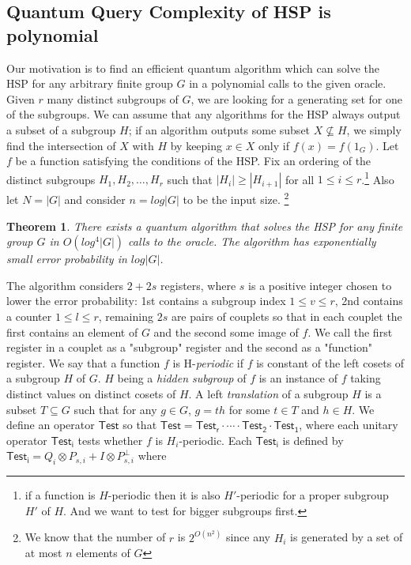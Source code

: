 \documentclass[12pt]{article}
\theoremstyle{plain}
\newtheorem{thm}{Theorem} %
\theoremstyle{definition}
\begin{document}
\subsection{Quantum Query Complexity of HSP is polynomial}
Our motivation is to find an efficient quantum algorithm which can solve the HSP for any arbitrary finite group $G$ in a polynomial calls to the given oracle. Given $r$ many distinct subgroups of $G$, we are looking for a generating set for one of the subgroups. We can assume that any algorithms for the HSP always output a subset of a subgroup $H$; if an algorithm outputs some subset $X\nsubseteq H$, we simply find the intersection of $X$ with $H$ by keeping $x\in X$ only if $f(x)=f(1_G)$.
\newline
Let $f$ be a function satisfying the conditions of the HSP. Fix an ordering of the distinct subgroups $H_1,H_2,\ldots,H_r$ such that $|H_{i}|\geq|H_{i+1}|$ for all $1\leq i \leq r$.\footnote{
if a function is $H$-periodic then it is also $H'$-periodic for a proper subgroup $H'$ of $H$. And we want to test for bigger subgroups first.}
Also let $N=|G|$ and consider $n=log|G|$ to be the input size. 
\footnote{
We know that the number of $r$ is $2^{O(n^2)}$ since any $H_i$ is generated by a set of at most $n$ elements of $G$}
\begin{thm}\label{thm3}
There exists a quantum algorithm that solves the HSP for any finite group $G$ in $O(log^4|G|)$ calls to the oracle. The algorithm has exponentially small error probability in $log|G|$.
\end{thm}
\noindent The algorithm considers $2+2s$ registers, where $s$ is a positive integer chosen to lower the error probability: 1st contains a subgroup index $1\leq v \leq r$, 2nd contains a counter $1\leq l \leq r$, remaining $2s$ are pairs of couplets so that in each couplet the first contains an element of $G$ and the second some image of $f$. We call the first register in a couplet as a "subgroup" register and the second as a "function" register.
\newline
We say that a function $f$ is H-\emph{periodic} if $f$ is constant of the left cosets of a subgroup $H$ of $G$. $H$ being a \emph{hidden subgroup} of $f$ is an instance of $f$ taking distinct values on distinct cosets of $H$.
\newline
A left \emph{translation} of a subgroup $H$ is a subset $T\subseteq G$ such that for any $g\in G$, $g=th$ for some $t\in T$ and $h\in H$.
\newline
We define an operator ${\mathsf{Test}}$ so that ${\mathsf{Test}}={\mathsf{Test_r}}\cdot\cdots\cdot{\mathsf{Test_2}}\cdot{\mathsf{Test_1}}$, where each unitary operator ${\mathsf{Test_i}}$ tests whether $f$ is $H_i$-periodic. Each ${\mathsf{Test_i}}$ is defined by ${\mathsf{Test_i}}=Q_i\otimes P_{s,i}+I\otimes P^{\perp}_{s,i}$ where
\end{document}
